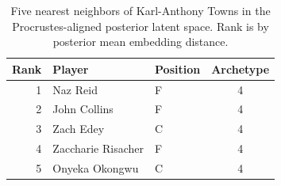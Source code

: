 \begin{table}[htbp]
  \centering\small
  \begin{tabular}{rllc}
    \toprule
    Rank & Player & Position & Archetype \\
    \midrule
    1 & Naz Reid & F & 4 \\
    2 & John Collins & F & 4 \\
    3 & Zach Edey & C & 4 \\
    4 & Zaccharie Risacher & F & 4 \\
    5 & Onyeka Okongwu & C & 4 \\
    \bottomrule
  \end{tabular}
  \caption{Five nearest neighbors of Karl-Anthony Towns in the Procrustes-aligned posterior latent space. Rank is by posterior mean embedding distance.}
  \label{tab:Karl_Anthony_Towns_neighbors}
\end{table}

